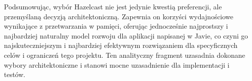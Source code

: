 Podsumowując, wybór Hazelcast nie jest jedynie kwestią preferencji, ale przemyślaną decyzją architektoniczną. Zapewnia on korzyści wydajnościowe wynikające z przetwarzania w pamięci, oferując jednocześnie najprostszy i najbardziej naturalny model rozwoju dla aplikacji napisanej w Javie, co czyni go najskuteczniejszym i najbardziej efektywnym rozwiązaniem dla specyficznych celów i ograniczeń tego projektu. Ten analityczny fragment uzasadnia dokonane wybory architektoniczne i stanowi mocne uzasadnienie dla implementacji i testów.
